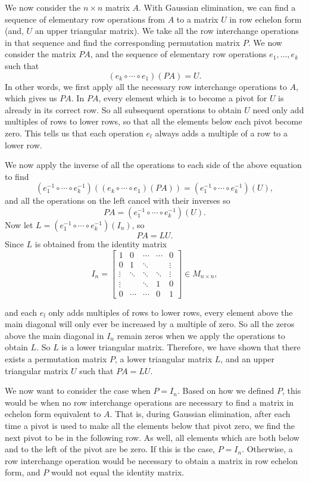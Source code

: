 \documentclass[12pt]{article}
\begin{document}
We now consider the $n\times n$ matrix $A$. With Gaussian elimination, we can find a sequence of elementary row operations from $A$ to a matrix $U$ in row echelon form (and, $U$ an upper triangular matrix). We take all the row interchange operations in that sequence and find the corresponding permutation matrix $P$. We now consider the matrix $PA$, and the sequence of elementary row operations $e_1,\dots,e_k$ such that
\[(e_k \circ \cdots \circ e_1)(PA) = U.\]
In other words, we first apply all the necessary row interchange operations to $A$, which gives us $PA$. In $PA$, every element which is to become a pivot for $U$ is already in its correct row. So all subsequent operations to obtain $U$ need only add multiples of rows to lower rows, so that all the elements below each pivot become zero. This tells us that each operation $e_l$ always adds a multiple of a row to a lower row.

We now apply the inverse of all the operations to each side of the above equation to find
\[(e_1^{-1}\circ\cdots\circ e_k^{-1})((e_k \circ \cdots \circ e_1)(PA)) = (e_1^{-1}\circ\cdots\circ e_k^{-1})(U),\]
and all the operations on the left cancel with their inverses so
\[PA = (e_1^{-1}\circ\cdots\circ e_k^{-1})(U).\]
Now let $L=(e_1^{-1}\circ\cdots\circ e_k^{-1})(I_n)$, so
\[PA = LU.\]
Since $L$ is obtained from the identity matrix
\[I_n = 
        \begin{bmatrix}
            1 & 0 & \cdots & \cdots & 0\\
            0 & 1 & \ddots &   & \vdots \\
            \vdots & \ddots & \ddots & \ddots & \vdots \\
            \vdots &   & \ddots & 1 & 0 \\
            0 & \cdots & \cdots & 0 & 1
        \end{bmatrix}
    \in M_{n\times n},
\]

and each $e_l$ only adds multiples of rows to lower rows, every element above the main diagonal will only ever be increased by a multiple of zero. So all the zeros above the main diagonal in $I_n$ remain zeros when we apply the operations to obtain $L$. So $L$ is a lower triangular matrix. Therefore, we have shown that there exists a permutation matrix $P$, a lower triangular matrix $L$, and an upper triangular matrix $U$ such that $PA = LU$.

We now want to consider the case when $P=I_n$. Based on how we defined $P$, this would be when no row interchange operations are necessary to find a matrix in echelon form equivalent to $A$. That is, during Gaussian elimination, after each time a pivot is used to make all the elements below that pivot zero, we find the next pivot to be in the following row. As well, all elements which are both below and to the left of the pivot are be zero. If this is the case, $P=I_n$. Otherwise, a row interchange operation would be necessary to obtain a matrix in row echelon form, and $P$ would not equal the identity matrix.
\end{document}
